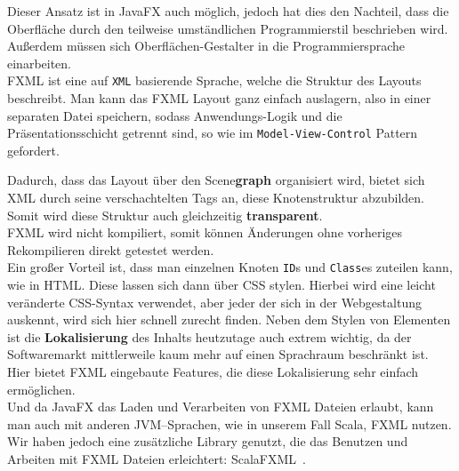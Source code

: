 Dieser Ansatz ist in JavaFX auch möglich, jedoch hat dies den Nachteil, dass die Oberfläche durch den teilweise umständlichen Programmierstil beschrieben wird. Außerdem müssen sich Oberflächen-Gestalter in die Programmiersprache einarbeiten.\\
FXML ist eine auf \texttt{XML} basierende Sprache, welche die Struktur des Layouts beschreibt. Man kann das FXML Layout ganz einfach auslagern, also in einer separaten Datei speichern, sodass Anwendungs-Logik und die Präsentationsschicht getrennt sind, so wie im \texttt{Model-View-Control} Pattern gefordert.

Dadurch, dass das Layout über den Scene\textbf{graph} organisiert wird, bietet sich XML durch seine verschachtelten Tags an, diese Knotenstruktur abzubilden. Somit wird diese Struktur auch gleichzeitig \textbf{transparent}.\\
FXML wird nicht kompiliert, somit können Änderungen ohne vorheriges Rekompilieren direkt getestet werden.\\
Ein großer Vorteil ist, dass man einzelnen Knoten \texttt{ID}s und \texttt{Class}es zuteilen kann, wie in HTML. Diese lassen sich dann über CSS stylen. Hierbei wird eine leicht veränderte CSS-Syntax verwendet, aber jeder der sich in der Webgestaltung auskennt, wird sich hier schnell zurecht finden. Neben dem Stylen von Elementen ist die \textbf{Lokalisierung} des Inhalts heutzutage auch extrem wichtig, da der Softwaremarkt mittlerweile kaum mehr auf einen Sprachraum beschränkt ist. Hier bietet FXML eingebaute Features, die diese Lokalisierung sehr einfach ermöglichen.\\
Und da JavaFX das Laden und Verarbeiten von FXML Dateien erlaubt, kann man auch mit anderen JVM--Sprachen, wie in unserem Fall Scala, FXML nutzen. Wir haben jedoch eine zusätzliche Library genutzt, die das Benutzen und Arbeiten mit FXML Dateien erleichtert: ScalaFXML~\cite{ScalaFXML}.

